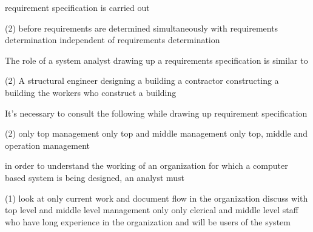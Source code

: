 \documentclass{article}
\begin{document}
\begin{questions}
\begin{exercise}
    \end{exercise}
    \begin{exercise}
        requirement specification is carried out
        \begin{choice}(2)
            \choice {}
            \choice before requirements are determined
            \choice simultaneously with requirements determination
            \choice independent of requirements determination
        \end{choice}
    \end{exercise}
    \begin{exercise}
        The role of a system analyst drawing up a requirements specification is similar to
        \begin{choice}(2)
            \choice {}
            \choice A structural engineer designing a building
            \choice a contractor constructing a building
            \choice the workers who construct a building
        \end{choice}
    \end{exercise}
    \begin{exercise}
        It's necessary to consult the following while drawing up requirement specification
        \begin{choice}(2)
            \choice only top management
            \choice only top and middle management
            \choice only top, middle and operation management
            \choice {}
        \end{choice}
    \end{exercise}
    \begin{exercise}
        in order to understand the working of an organization for which a computer based system is being designed, an analyst must
        \begin{choice}(1)
            \choice look at only current work and document flow in the organization
            \choice discuss with top level and middle level management only
            \choice {}
            \choice  only clerical and middle level staff who have long experience in the organization and will be users of the system
        \end{choice}
    \end{exercise}
    \begin{exercise}

\end{exercise}
\end{questions}
\end{document}
